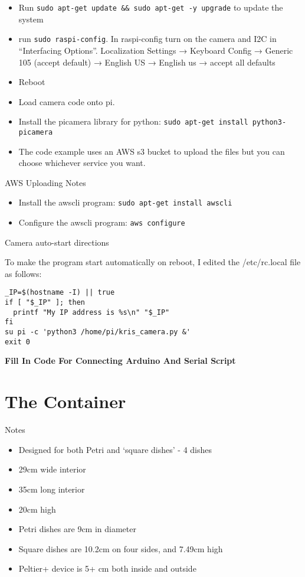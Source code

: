 \documentclass[]{book}
\providecommand{\tightlist}{%
  \setlength{\itemsep}{0pt}\setlength{\parskip}{0pt}}
\begin{document}
\begin{itemize}
\item
  Run \texttt{sudo\ apt-get\ update\ \&\&\ sudo\ apt-get\ -y\ upgrade} to update the system
\item
  run \texttt{sudo\ raspi-config}. In raspi-config turn on the camera and I2C in ``Interfacing Options''. Localization Settings → Keyboard Config → Generic 105 (accept default) → English US → English us → accept all defaults
\item
  Reboot
\item
  Load camera code onto pi.
\item
  Install the picamera library for python: \texttt{sudo\ apt-get\ install\ python3-picamera}
\item
  The code example uses an AWS s3 bucket to upload the files but you can choose whichever service you want.
\end{itemize}

AWS Uploading Notes

\begin{itemize}
\item
  Install the awscli program: \texttt{sudo\ apt-get\ install\ awscli}
\item
  Configure the awscli program: \texttt{aws\ configure}
\end{itemize}

Camera auto-start directions

To make the program start automatically on reboot, I edited the /etc/rc.local file as follows:

\begin{verbatim}
_IP=$(hostname -I) || true
if [ "$_IP" ]; then
  printf "My IP address is %s\n" "$_IP"
fi
su pi -c 'python3 /home/pi/kris_camera.py &'
exit 0
\end{verbatim}

\textbf{Fill In Code For Connecting Arduino And Serial Script}

\hypertarget{the-container}{%
\chapter{The Container}\label{the-container}}

Notes

\begin{itemize}
\tightlist
\item
  Designed for both Petri and `square dishes' - 4 dishes
\item
  29cm wide interior
\item
  35cm long interior
\item
  20cm high
\item
  Petri dishes are 9cm in diameter
\item
  Square dishes are 10.2cm on four sides, and 7.49cm high
\item
  Peltier+ device is 5+ cm both inside and outside
\end{itemize}
\end{document}
